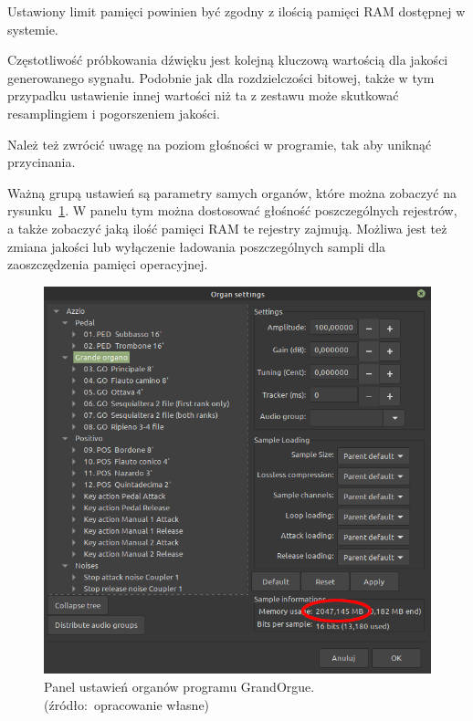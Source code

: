 \documentclass[11pt]{report}
\begin{document}
    Ustawiony limit pamięci powinien być zgodny z ilością pamięci RAM dostępnej w systemie.

    Częstotliwość próbkowania dźwięku jest kolejną kluczową wartością dla jakości generowanego sygnału.
    Podobnie jak dla rozdzielczości bitowej, także w tym przypadku ustawienie innej wartości niż ta z zestawu może skutkować resamplingiem i pogorszeniem jakości.

    Należ też zwrócić uwagę na poziom głośności w programie, tak aby uniknąć przycinania.

    Ważną grupą ustawień są parametry samych organów, które można zobaczyć na rysunku~\ref{fig:organy}.
    W panelu tym można dostosować głośność poszczególnych rejestrów, a także zobaczyć jaką ilość pamięci RAM te rejestry zajmują.
    Możliwa jest też zmiana jakości lub wyłączenie ładowania poszczególnych sampli dla zaoszczędzenia pamięci operacyjnej.
    \begin{figure}[!ht]
        \centering
        \includegraphics[width=\linewidth]{fig/organR.png}
        \caption{Panel ustawień organów programu GrandOrgue. (źródło:~opracowanie własne)}
        \label{fig:organy}
    \end{figure}
\end{document}
